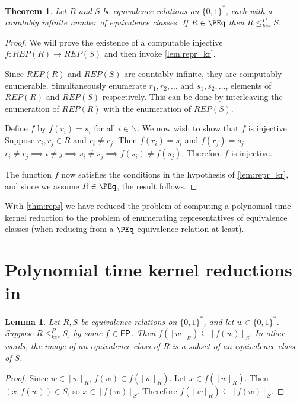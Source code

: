 \documentclass{article}
\newtheorem{theorem}{Theorem}[section]
\newtheorem{lemma}[lemma]{Lemma}
\theoremstyle{definition} \newtheorem{definition}[definition]{Definition}
\newcommand{\sigmastar}{\{0, 1\}^{*}} %
\newcommand{\kr}{\leq^{P}_{ker}} %
\begin{document}
\begin{theorem}\label{thm:reps}
  Let $R$ and $S$ be equivalence relations on $\sigmastar$, each with a countably infinite number of equivalence classes.
  If $R\in\PEq$ then $R\kr S$.
\end{theorem}
\begin{proof}
  We will prove the existence of a computable injective $f\colon REP(R)\to REP(S)$ and then invoke \autoref{lem:repr_kr}.

  Since $REP(R)$ and $REP(S)$ are countably infinite, they are computably enumerable.
  Simultaneously enumerate $r_1, r_2, \ldots$ and $s_1, s_2, \ldots$, elements of $REP(R)$ and $REP(S)$ respectively.
  This can be done by interleaving the enumeration of $REP(R)$ with the enumeration of $REP(S)$.

  Define $f$ by $f(r_i)=s_i$ for all $i\in\mathbb{N}$.
  We now wish to show that $f$ is injective.
  Suppose $r_i,r_j\in R$ and $r_i\neq r_j$.
  Then $f(r_i)=s_i$ and $f(r_j)=s_j$. $r_i\neq r_j\implies i\neq j\implies s_i\neq s_j\implies f(s_i)\neq f(s_j)$.
  Therefore $f$ is injective.

  The function $f$ now satisfies the conditions in the hypothesis of \autoref{lem:repr_kr}, and since we assume $R\in\PEq$, the result follows.
\end{proof}

With \autoref{thm:reps} we have reduced the problem of computing a polynomial time kernel reduction to the problem of enumerating representatives of equivalence classes (when reducing from a $\PEq$ equivalence relation at least).

\section{Polynomial time kernel reductions in \texorpdfstring{\NPEq}{NPEq}}

\begin{lemma}\label{lem:image}
  Let $R,S$ be equivalence relations on $\sigmastar$, and let $w\in\sigmastar$.
  Suppose $R\kr S$, by some $f\in{\ensuremath{\mathsf{FP}}}$.
  Then $f([w]_R)\subseteq [f(w)]_S$.
  In other words, the image of an equivalence class of $R$ is a subset of an equivalence class of $S$.
\end{lemma}
\begin{proof}
  Since $w\in [w]_R$, $f(w)\in f([w]_R)$.
  Let $x\in f([w]_R)$.
  Then $(x, f(w))\in S$, so $x\in [f(w)]_S$.
  Therefore $f([w]_R)\subseteq [f(w)]_S$.
\end{proof}
\end{document}
